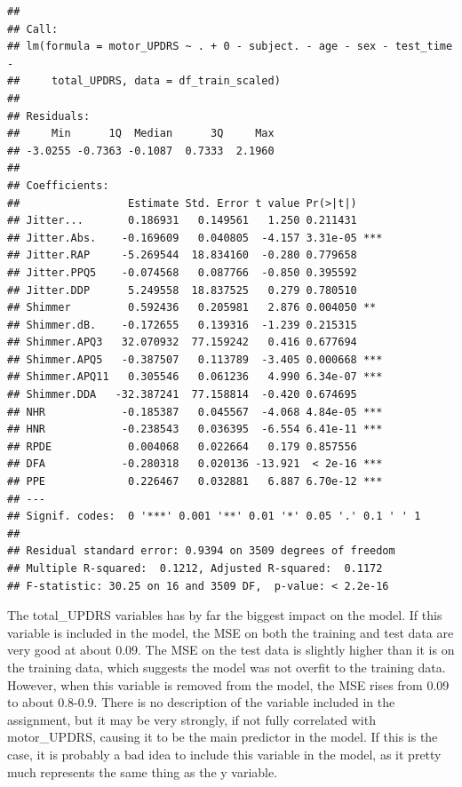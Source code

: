 \documentclass[
]{article}
\begin{document}
\begin{verbatim}
## 
## Call:
## lm(formula = motor_UPDRS ~ . + 0 - subject. - age - sex - test_time - 
##     total_UPDRS, data = df_train_scaled)
## 
## Residuals:
##     Min      1Q  Median      3Q     Max 
## -3.0255 -0.7363 -0.1087  0.7333  2.1960 
## 
## Coefficients:
##                 Estimate Std. Error t value Pr(>|t|)    
## Jitter...       0.186931   0.149561   1.250 0.211431    
## Jitter.Abs.    -0.169609   0.040805  -4.157 3.31e-05 ***
## Jitter.RAP     -5.269544  18.834160  -0.280 0.779658    
## Jitter.PPQ5    -0.074568   0.087766  -0.850 0.395592    
## Jitter.DDP      5.249558  18.837525   0.279 0.780510    
## Shimmer         0.592436   0.205981   2.876 0.004050 ** 
## Shimmer.dB.    -0.172655   0.139316  -1.239 0.215315    
## Shimmer.APQ3   32.070932  77.159242   0.416 0.677694    
## Shimmer.APQ5   -0.387507   0.113789  -3.405 0.000668 ***
## Shimmer.APQ11   0.305546   0.061236   4.990 6.34e-07 ***
## Shimmer.DDA   -32.387241  77.158814  -0.420 0.674695    
## NHR            -0.185387   0.045567  -4.068 4.84e-05 ***
## HNR            -0.238543   0.036395  -6.554 6.41e-11 ***
## RPDE            0.004068   0.022664   0.179 0.857556    
## DFA            -0.280318   0.020136 -13.921  < 2e-16 ***
## PPE             0.226467   0.032881   6.887 6.70e-12 ***
## ---
## Signif. codes:  0 '***' 0.001 '**' 0.01 '*' 0.05 '.' 0.1 ' ' 1
## 
## Residual standard error: 0.9394 on 3509 degrees of freedom
## Multiple R-squared:  0.1212, Adjusted R-squared:  0.1172 
## F-statistic: 30.25 on 16 and 3509 DF,  p-value: < 2.2e-16
\end{verbatim}

The total\_UPDRS variables has by far the biggest impact on the model.
If this variable is included in the model, the MSE on both the training
and test data are very good at about 0.09. The MSE on the test data is
slightly higher than it is on the training data, which suggests the
model was not overfit to the training data. However, when this variable
is removed from the model, the MSE rises from 0.09 to about 0.8-0.9.
There is no description of the variable included in the assignment, but
it may be very strongly, if not fully correlated with motor\_UPDRS,
causing it to be the main predictor in the model. If this is the case,
it is probably a bad idea to include this variable in the model, as it
pretty much represents the same thing as the y variable.
\end{document}
